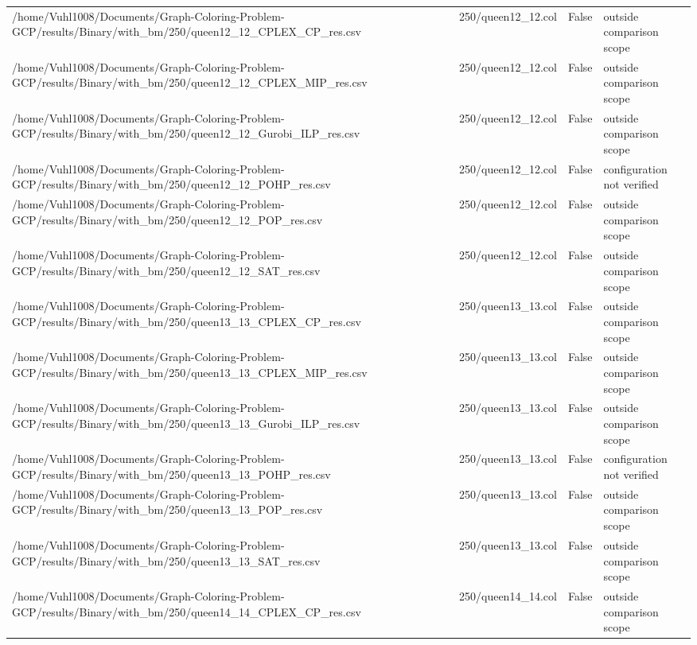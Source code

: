 \begin{table}[htbp]
\begin{tabular}{llll}
/home/Vuhl1008/Documents/Graph-Coloring-Problem-GCP/results/Binary/with\_bm/250/queen12\_12\_CPLEX\_CP\_res.csv & 250/queen12\_12.col & False & outside comparison scope \\
/home/Vuhl1008/Documents/Graph-Coloring-Problem-GCP/results/Binary/with\_bm/250/queen12\_12\_CPLEX\_MIP\_res.csv & 250/queen12\_12.col & False & outside comparison scope \\
/home/Vuhl1008/Documents/Graph-Coloring-Problem-GCP/results/Binary/with\_bm/250/queen12\_12\_Gurobi\_ILP\_res.csv & 250/queen12\_12.col & False & outside comparison scope \\
/home/Vuhl1008/Documents/Graph-Coloring-Problem-GCP/results/Binary/with\_bm/250/queen12\_12\_POHP\_res.csv & 250/queen12\_12.col & False & configuration not verified \\
/home/Vuhl1008/Documents/Graph-Coloring-Problem-GCP/results/Binary/with\_bm/250/queen12\_12\_POP\_res.csv & 250/queen12\_12.col & False & outside comparison scope \\
/home/Vuhl1008/Documents/Graph-Coloring-Problem-GCP/results/Binary/with\_bm/250/queen12\_12\_SAT\_res.csv & 250/queen12\_12.col & False & outside comparison scope \\
/home/Vuhl1008/Documents/Graph-Coloring-Problem-GCP/results/Binary/with\_bm/250/queen13\_13\_CPLEX\_CP\_res.csv & 250/queen13\_13.col & False & outside comparison scope \\
/home/Vuhl1008/Documents/Graph-Coloring-Problem-GCP/results/Binary/with\_bm/250/queen13\_13\_CPLEX\_MIP\_res.csv & 250/queen13\_13.col & False & outside comparison scope \\
/home/Vuhl1008/Documents/Graph-Coloring-Problem-GCP/results/Binary/with\_bm/250/queen13\_13\_Gurobi\_ILP\_res.csv & 250/queen13\_13.col & False & outside comparison scope \\
/home/Vuhl1008/Documents/Graph-Coloring-Problem-GCP/results/Binary/with\_bm/250/queen13\_13\_POHP\_res.csv & 250/queen13\_13.col & False & configuration not verified \\
/home/Vuhl1008/Documents/Graph-Coloring-Problem-GCP/results/Binary/with\_bm/250/queen13\_13\_POP\_res.csv & 250/queen13\_13.col & False & outside comparison scope \\
/home/Vuhl1008/Documents/Graph-Coloring-Problem-GCP/results/Binary/with\_bm/250/queen13\_13\_SAT\_res.csv & 250/queen13\_13.col & False & outside comparison scope \\
/home/Vuhl1008/Documents/Graph-Coloring-Problem-GCP/results/Binary/with\_bm/250/queen14\_14\_CPLEX\_CP\_res.csv & 250/queen14\_14.col & False & outside comparison scope \\

\end{tabular}
\end{table}
